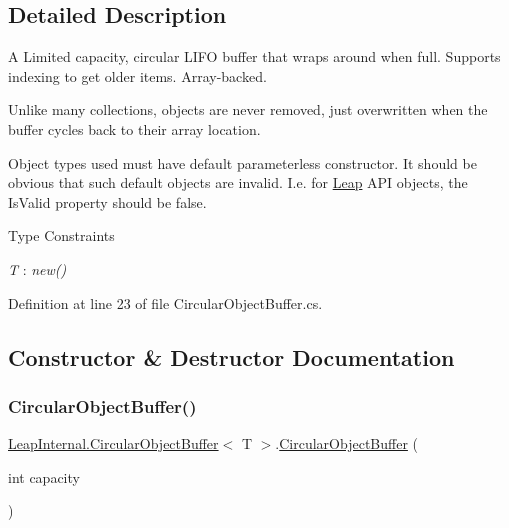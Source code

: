 \subsection{Detailed Description}
A Limited capacity, circular L\+I\+FO buffer that wraps around when full. Supports indexing to get older items. Array-\/backed.
\begin{DoxyItemize}
\item Unlike many collections, objects are never removed, just overwritten when the buffer cycles back to their array location.
\end{DoxyItemize}

Object types used must have default parameterless constructor. It should be obvious that such default objects are invalid. I.\+e. for \mbox{\hyperlink{namespace_leap}{Leap}} A\+PI objects, the Is\+Valid property should be false. \begin{Desc}
\item[Type Constraints]\begin{description}
\item[{\em T} : {\em new()}]\end{description}
\end{Desc}


Definition at line 23 of file Circular\+Object\+Buffer.\+cs.



\subsection{Constructor \& Destructor Documentation}
\mbox{\label{class_leap_internal_1_1_circular_object_buffer_ab47600a8fd18eaf2e7c4a93bd94a6939}} 
\subsubsection{\texorpdfstring{CircularObjectBuffer()}{CircularObjectBuffer()}}
{\footnotesize\ttfamily \mbox{\hyperlink{class_leap_internal_1_1_circular_object_buffer}{Leap\+Internal.\+Circular\+Object\+Buffer}}$<$ T $>$.\mbox{\hyperlink{class_leap_internal_1_1_circular_object_buffer}{Circular\+Object\+Buffer}} (\begin{DoxyParamCaption}\item[{int}]{capacity }\end{DoxyParamCaption})}




